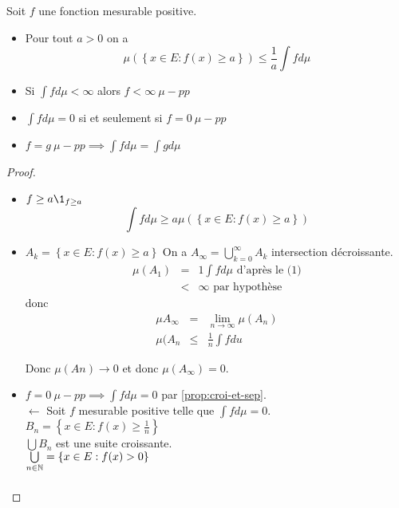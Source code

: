 \begin{prop}
	Soit $f$ une fonction mesurable positive.
	\begin{itemize}
		\item Pour tout $a > 0$ on a
		      $$ \mu\left(\left\{ x \in E : f(x) \geq a \right\}\right) \leq \frac{1}{a} \int f d\mu $$
		\item Si $\int f d\mu < \infty$ alors $f < \infty \ \mu-pp$
		\item $\int f d\mu = 0$ si et seulement si $f = 0 \ \mu-pp$
		\item $f=g \ \mu-pp \implies \int f d\mu = \int g d\mu$
	\end{itemize}
\end{prop}

\begin{proof}
	\begin{itemize}
		\item $f \geq a \1_{f \geq a}$
		      $$\int f d \mu \geq a \mu \left( \left\{ x \in E : f(x) \geq a \right\} \right) $$
		\item $A_k = \left\{ x \in E : f(x) \geq a \right\}$
		      On a $A_{\infty} = \bigcup_{k=0}^{\infty} A_k$ intersection décroissante.
		      \begin{eqnarray*}
			      \mu(A_1) &=& 1 \int f d \mu \text{ d'après  le (1)}\\
			      &<& \infty \text{ par hypothèse}
		      \end{eqnarray*}
		      donc \begin{eqnarray*}
			      \mu {A_{\infty}} &=& \lim\limits_{n \to \infty} \mu(A_n) \\
			      \mu(A_{n} &\leq& \frac{1}{n} \int f d u
		      \end{eqnarray*}

		      Donc $\mu (An) \to 0$ et donc $\mu(A_{\infty}) = 0$.
		\item $f= 0 \ \mu-pp \implies \int f d\mu = 0$  par  \ref{prop:croi-et-sep}.\\
		      $\leftarrow$ Soit  $f$ mesurable positive telle que $\int f d\mu = 0$.\\
		      $B_n = \left\{ x \in E : f(x) \geq \frac{1}{n} \right\}$\\
		      $\bigcup B_n$ est une suite croissante. \\
		      $\bigcup\limits_{n \in \mathbb{N}} = \left\{ x \in E : f(x) > 0 \right\}$\\

		      \begin{eqnarray*} %
		      \end{eqnarray*}

	\end{itemize}
\end{proof}


